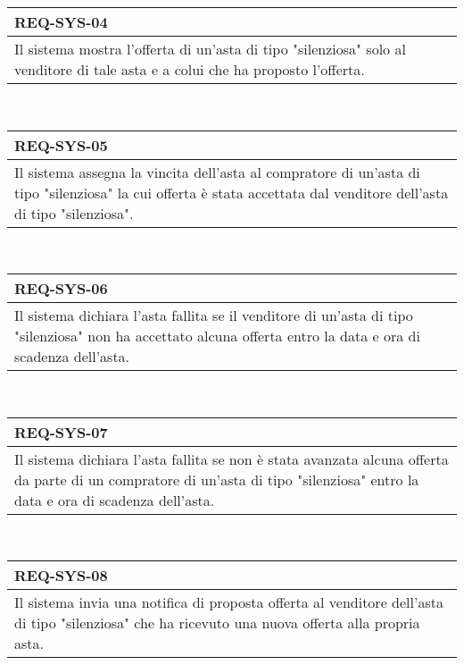                 \begin{tabular}{|p{}|}
                    \hline
                    \multicolumn{1}{|l|}{\cellcolor{head}\textbf{REQ-SYS-04}} \\
                    \hline
                    Il sistema mostra l'offerta di un'asta di tipo "silenziosa" solo al venditore di tale asta e a colui che ha proposto l'offerta. \\
                    \hline
                \end{tabular} \smallskip \\
                \begin{tabular}{|p{}|}
                    \hline
                    \multicolumn{1}{|l|}{\cellcolor{head}\textbf{REQ-SYS-05}} \\
                    \hline
                    Il sistema assegna la vincita dell'asta al compratore di un'asta di tipo "silenziosa" la cui offerta è stata accettata dal venditore dell'asta di tipo "silenziosa". \\
                    \hline
                \end{tabular} \smallskip \\
                \begin{tabular}{|p{}|}
                    \hline
                    \multicolumn{1}{|l|}{\cellcolor{head}\textbf{REQ-SYS-06}} \\
                    \hline
                    Il sistema dichiara l'asta fallita se il venditore di un'asta di tipo "silenziosa" non ha accettato alcuna offerta entro la data e ora di scadenza dell'asta. \\
                    \hline
                \end{tabular} \smallskip \\
                \begin{tabular}{|p{}|}
                    \hline
                    \multicolumn{1}{|l|}{\cellcolor{head}\textbf{REQ-SYS-07}} \\
                    \hline
                    Il sistema dichiara l'asta fallita se non è stata avanzata alcuna offerta da parte di un compratore di un'asta di tipo "silenziosa" entro la data e ora di scadenza dell'asta. \\
                    \hline
                \end{tabular} \smallskip \\
                \begin{tabular}{|p{}|}
                    \hline
                    \multicolumn{1}{|l|}{\cellcolor{head}\textbf{REQ-SYS-08}} \\
                    \hline
                    Il sistema invia una notifica di proposta offerta al venditore dell'asta di tipo "silenziosa" che ha ricevuto una nuova offerta alla propria asta. \\
                    \hline
                \end{tabular} \smallskip \\
